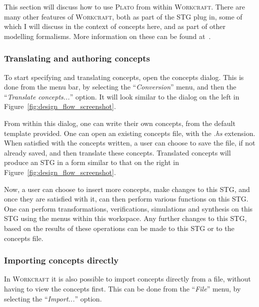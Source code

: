 \documentclass[british,conference,compsoc]{IEEEtran}
\newcommand{\noun}[1]{\textsc{#1}}
\begin{document}
This section will discuss how to use \noun{Plato} from within
\noun{Workcraft}. There are many other features of \noun{Workcraft}, both as 
part of the STG plug in, some of which I will discuss in the context of 
concepts here, and as part of other modelling formalisms. More information on 
these can be found at~\cite{Workcraft_website}.

\vspace{-2mm}
 
\subsubsection{Translating and authoring concepts}

To start specifying and translating concepts, open the concepts dialog.  This is
done from the menu bar, by selecting the ``\emph{Conversion}'' menu, and then
the ``\emph{Translate concepts...}'' option. It will look similar to the dialog 
on the left in Figure~\ref{fig:design_flow_screenshot}.

From within this dialog, one can write their own concepts, from the default 
template provided. One can open an 
existing concepts file, with the \emph{.hs} extension. When satisfied with the 
concepts written, a user can choose to save the file, if not already saved, and
then translate these concepts. Translated concepts will produce an STG in a 
form similar to that on the right in Figure~\ref{fig:design_flow_screenshot}.

Now, a user can choose to insert more 
concepts, make changes to this STG, and once they are satisfied with it, can 
then perform various functions on this STG. One can perform transformations, 
verifications, simulations and synthesis on this STG using the menus within this 
workspace. Any further changes to this STG, based on the results of these 
operations can be made to this STG or to the concepts file. 

\subsubsection{Importing concepts directly}

\vspace{-2mm}

In \noun{Workcraft} it is also possible to import concepts directly from a file,
without having to view the concepts first. This can be done from the 
``\emph{File}'' menu, by selecting the ``\emph{Import...}'' option. 
\end{document}
